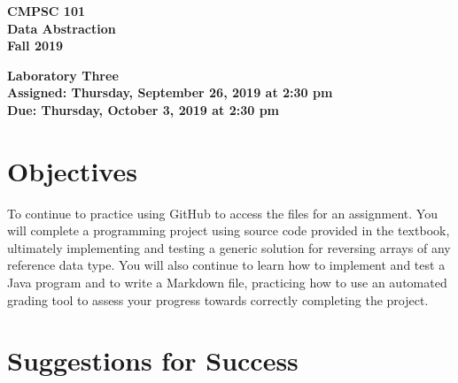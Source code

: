 \documentclass[11pt]{article}
\newcommand{\assignmentduedate}{October 3}
\newcommand{\assignmentassignedate}{September 26}
\newcommand{\assignmentnumber}{Three}
\newcommand{\labyear}{2019}
\newcommand{\labday}{Thursday}
\newcommand{\labtime}{2:30 pm}
\newcommand{\assigneddate}{Assigned: \labday, \assignmentassignedate, \labyear{} at \labtime{}}
\newcommand{\duedate}{Due: \labday, \assignmentduedate, \labyear{} at \labtime{}}
\newcommand{\labtitle}[1]
{
  \begin{center}
    \begin{center}
      \bf
      CMPSC 101\\Data Abstraction\\
      Fall 2019\\
      \medskip
    \end{center}
    \bf
    #1
  \end{center}
}
\begin{document}
\thispagestyle{empty}

\labtitle{Laboratory \assignmentnumber{} \\ \assigneddate{} \\ \duedate{}}

\section*{Objectives}

To continue to practice using GitHub to access the files for an assignment. You
will complete a programming project using source code provided in the textbook,
ultimately implementing and testing a generic solution for reversing arrays of
any reference data type. You will also continue to learn how to implement and
test a Java program and to write a Markdown file, practicing how to use an
automated grading tool to assess your progress towards correctly completing the
project.

\section*{Suggestions for Success}
\end{document}
